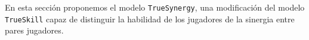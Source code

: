 \documentclass[a4paper,11pt]{book}
\theoremstyle{definition}
\begin{document}
En esta secci\'on proponemos el modelo \texttt{TrueSynergy}, una modificaci\'on del modelo \texttt{TrueSkill} capaz de distinguir la habilidad de los jugadores de la sinergia entre pares jugadores.
%
%
%
%
%
%
%
%
%
%
\end{document}
